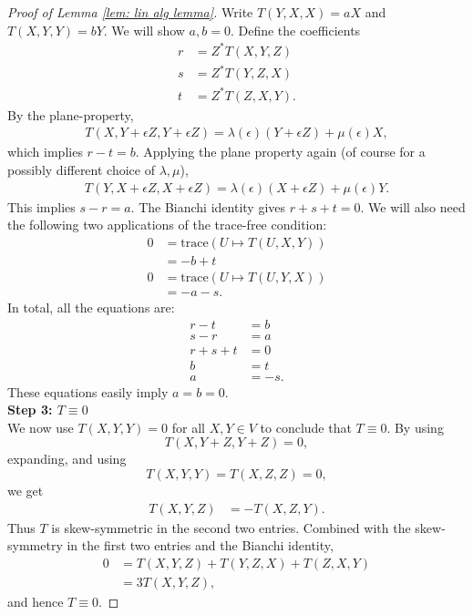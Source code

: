 \documentclass{article}
\numberwithin{equation}{section}
\theoremstyle{plain}
\begin{document}
\begin{proof}[Proof of Lemma \ref{lem: lin alg lemma}]
Write $T(Y,X,X) = aX$ and $T(X,Y,Y) = bY$. We will show $a,b=0$. Define the coefficients 
\begin{align}
    r &= Z^* T(X,Y,Z) \\
    s &= Z^*T(Y,Z,X) \\
    t &= Z^*T(Z,X,Y).
\end{align}
By the plane-property, 
\begin{align}\label{eq: 3 alg lemma}
    T(X, Y+\epsilon Z, Y +\epsilon Z) = \lambda(\epsilon) (Y + \epsilon Z) + \mu(\epsilon) X,
    \end{align}
    which implies $r-t=b$. 
    Applying the plane property again (of course for a possibly different choice of $\lambda, \mu$), 
    \begin{align}
        T(Y, X + \epsilon Z, X + \epsilon Z) = \lambda(\epsilon) (X+ \epsilon Z) + \mu(\epsilon)Y.
    \end{align}
    This implies $s-r = a$. The Bianchi identity gives $r + s + t =0$. We will also need the following two applications of the trace-free condition: 
    \begin{align}
        0 &= \mathrm{trace}(U \mapsto T(U,X,Y)) \\
        &= -b + t \\
        0 &= \mathrm{trace}(U \mapsto T(U,Y,X)) \\
        &= -a - s.
    \end{align}
    In total, all the equations are: 
    \begin{align}
        r - t &= b \\
        s-r &= a \\
        r + s + t &= 0 \\
        b &= t \\
        a &= -s.
    \end{align}
    These equations easily imply $a = b = 0$. \\

    \noindent \textbf{Step 3: $T \equiv 0$}\\

    We now use $T(X,Y,Y) = 0$ for all $X,Y \in V$ to conclude that $T \equiv 0$. By using
    \begin{equation}
    T(X, Y+ Z, Y+Z) =0,
    \end{equation}
     expanding, and using 
     \begin{equation}
     T(X,Y,Y) = T(X,Z,Z) = 0,
     \end{equation}
      we get  
    \begin{align}
        T(X,Y,Z) &= - T(X,Z,Y). 
    \end{align}
    Thus $T$ is skew-symmetric in the second two entries. Combined with the skew-symmetry in the first two entries and the Bianchi identity,
    \begin{align}
        0 &= T(X,Y,Z) + T(Y,Z,X) + T(Z,X,Y) \\
        &= 3T(X,Y,Z),
    \end{align}
    and hence $T \equiv 0$. 
\end{proof}
\end{document}
